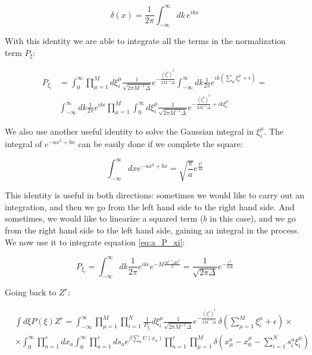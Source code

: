 \begin{equation}
  \label{eq:a_27}
  \delta(x) = \frac{1}{2\pi} \int_{-\infty}^\infty dk\, e^{i k x}
\end{equation}

With this identity we are able to integrate all the terms in the normalization term $P_\xi$:

\begin{align}
  \label{eq:a_P_xi}
  P_{\xi_i} & = \int_0^\infty \prod_{\mu=1}^M d\xi_i^\mu
  \frac{1}{\sqrt{2\pi M^{-1}\Delta}}e^{-\frac{(\xi_i^\mu)^2}{2 M^{-1}\Delta}}
  \int_{-\infty}^\infty dk \frac{1}{2\pi} e^{i k (\sum_\mu \xi_i^\mu + \epsilon)} =
  \\ & \int_{-\infty}^\infty dk \frac{1}{2\pi} e^{ik\epsilon} \prod_{\mu=1}^M
  \int_0^\infty d\xi_i^\mu \frac{1}{\sqrt{2\pi
      M^{-1}\Delta}}e^{-\frac{(\xi_i^\mu)^2}{2 M^{-1}\Delta} + i k \xi_i^\mu}
\end{align}

We also use another useful identity to solve the Gaussian integral in $\xi_i^\mu$. The integral of $e^{-a x^2 + b x}$ can be easily done if we complete the square:

\begin{equation}
  \label{eq:a_gaussian_integral}
  \int_{-\infty}^\infty dx e^{-ax^2 + bx} = \sqrt{\frac{\pi}{a}} e^{\frac{b^2}{4a}}
\end{equation}

This identity is useful in both directions: sometimes we would like to carry out an integration, and then we go from the left hand side to the right hand side. And sometimes, we would like to linearize a squared term ($b$ in this case), and we go from the right hand side to the left hand side, gaining an integral in the process. We now use it to integrate equation \eqref{eq:a_P_xi}:

\begin{equation}
  \label{eq:a_29}
  P_{\xi_i} = \int_{-\infty}^\infty dk \frac{1}{2\pi} e^{ik\epsilon} 
  e^{-M\frac{M^{-1}\Delta k^2}{2}} = \frac{1}{\sqrt{2\pi\Delta}} e^{-\frac{\epsilon^2}{2\Delta}}
\end{equation}

Going back to $Z^r$:

\begin{align}
    \label{eq:a_30}
    & \int d\xi P(\xi)
  Z^r = \int_{-\infty}^\infty \prod_{\mu=1}^M \prod_{i=1}^N
      \frac{1}{P_{\xi_i}} d\xi_i^\mu \frac{1}{\sqrt{2\pi
      M^{-1}\Delta}}e^{-\frac{(\xi_i^\mu)^2}{2 M^{-1}\Delta}}\, 
    \delta\left(\sum_{\mu=1}^M \xi_i^\mu + \epsilon\right) \times \\ &
    \times \int_0^\infty \prod_{a=1}^r d x_a \int_0^\infty
    \prod_{a=1}^r d s_a e^{\beta \sum_a U(x_a)} \prod_{a=1}^r
    \prod_{\mu=1}^M \delta \left(x_\mu^a - x_0^\mu - \sum_{i=1}^N s_i^a
      \xi_i^\mu \right) \nonumber
\end{align}

